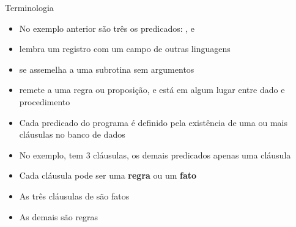 \begin{frame}[fragile]{Terminologia}

    \begin{itemize}
        \item No exemplo anterior são três os predicados: ,
             e 

        \item {} lembra um registro com um campo de outras linguagens

        \item {} se assemelha a uma subrotina sem argumentos

        \item {} remete a uma regra ou proposição, e está em algum lugar 
            entre dado e procedimento

        \item Cada predicado do programa é definido pela existência de uma ou mais cláusulas 
            no banco de dados

        \item No exemplo,  tem 3 cláusulas, os demais predicados apenas 
            uma cláusula

        \item Cada cláusula pode ser uma \textbf{regra} ou um \textbf{fato}

        \item As três cláusulas de  são fatos

        \item As demais são regras
    \end{itemize}

\end{frame}


